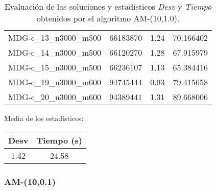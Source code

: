 \documentclass{article}
\begin{document}
\begin{table}[H]
\begin{tabular}{|cccc|}
		MDG-c\_13\_n3000\_m500 & 66183870 & 1.24 & 70.166402\\
		MDG-c\_14\_n3000\_m500 & 66120270 & 1.28 & 67.915979\\
		MDG-c\_15\_n3000\_m500 & 66236107 & 1.13 & 65.384416\\
		MDG-c\_19\_n3000\_m600 & 94745444 & 0.93 & 79.415658\\
		MDG-c\_20\_n3000\_m600 & 94389441 & 1.31 & 89.668006\\
		\hline
	\end{tabular}
	\caption{Evaluación de las soluciones y estadísticos \emph{Desv} y \emph{Tiempo} obtenidos por el algoritmo AM-(10,1.0).}
	\label{tab:am-10-1}
\end{table}

Media de los estadísticos:
\begin{table}[H]
	\centering
	\begin{tabular}{|cc|}
		\hline
		Desv & Tiempo (s)\\ \hline
		1.42 & 24.58 \\
		\hline
	\end{tabular}
\end{table}

\pagebreak

\subsubsection*{AM-(10,0.1)}
\end{document}
